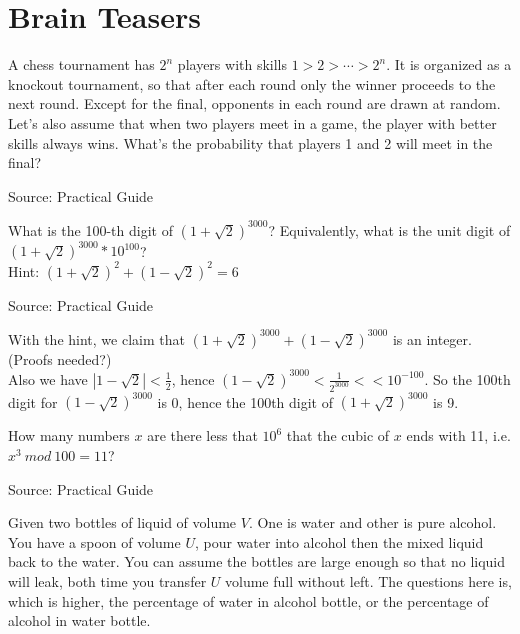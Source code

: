 \chapter{Brain Teasers}

\begin{exe}
A chess tournament has $2^n$ players with skills $1>2>\cdots>2^n$. It is organized as a
knockout tournament, so that after each round only the winner proceeds to the next
round. Except for the final, opponents in each round are drawn at random. Let's also
assume that when two players meet in a game, the player with better skills always wins.
What's the probability that players 1 and 2 will meet in the final?
\end{exe}
\begin{teacher}
Source: Practical Guide
\begin{sol}
\end{sol}
\end{teacher}

\begin{exe}[100th digit]
What is the 100-th digit of $(1+\sqrt{2})^{3000}$? Equivalently, what is the unit digit of $(1+\sqrt{2})^{3000}*10^{100}$?\\
Hint: $(1+\sqrt{2})^2 + (1-\sqrt{2})^2=6$
\end{exe}
\begin{teacher}
Source: Practical Guide
\begin{sol}
With the hint, we claim that $(1+\sqrt{2})^{3000} + (1-\sqrt{2})^{3000}$ is an integer. (Proofs needed?)\\
Also we have $|1-\sqrt{2}|<\frac{1}{2}$, hence $(1-\sqrt{2})^{3000}< \frac{1}{2^{3000}}<<10^{-100}$. So the 100th digit for $(1-\sqrt{2})^{3000}$ is 0, hence the 100th digit of $(1+\sqrt{2})^{3000}$ is 9.
\end{sol}
\end{teacher}

\begin{exe}
How many numbers $x$ are there less that $10^6$ that the cubic of $x$ ends with 11, i.e. $x^3\ mod\  100=11$?
\end{exe}
\begin{teacher}
Source: Practical Guide
\begin{sol}
\end{sol}
\end{teacher}

\begin{exe}
Given two bottles of liquid of volume $V$. One is water and other is pure alcohol. You have a spoon of volume $U$, pour water into alcohol then the mixed liquid back to the water. You can assume the bottles are large enough so that no liquid will leak, both time you transfer $U$ volume full without left. The questions here is, which is higher, the percentage of water in alcohol bottle, or the percentage of alcohol in water bottle. 
\end{exe}
\begin{teacher}
\begin{sol}
\end{sol}
\end{teacher}

